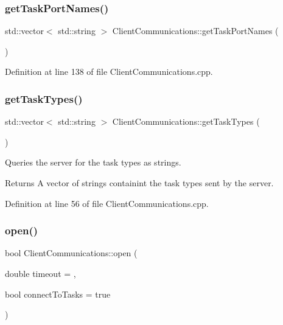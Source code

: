 \subsubsection{\texorpdfstring{get\+Task\+Port\+Names()}{getTaskPortNames()}}
{\footnotesize\ttfamily std\+::vector$<$ std\+::string $>$ Client\+Communications\+::get\+Task\+Port\+Names (\begin{DoxyParamCaption}{ }\end{DoxyParamCaption})}



Definition at line 138 of file Client\+Communications.\+cpp.

\hypertarget{classocra__recipes_1_1ClientCommunications_a0a7b2eeaa35d925e63ba4568be1e4919}{}\label{classocra__recipes_1_1ClientCommunications_a0a7b2eeaa35d925e63ba4568be1e4919} 
\subsubsection{\texorpdfstring{get\+Task\+Types()}{getTaskTypes()}}
{\footnotesize\ttfamily std\+::vector$<$ std\+::string $>$ Client\+Communications\+::get\+Task\+Types (\begin{DoxyParamCaption}{ }\end{DoxyParamCaption})}

Queries the server for the task types as strings.

\begin{DoxyReturn}{Returns}
A vector of strings containint the task types sent by the server. 
\end{DoxyReturn}


Definition at line 56 of file Client\+Communications.\+cpp.

\hypertarget{classocra__recipes_1_1ClientCommunications_a5ef6606831f855ae97815f4a34e1e1a1}{}\label{classocra__recipes_1_1ClientCommunications_a5ef6606831f855ae97815f4a34e1e1a1} 
\subsubsection{\texorpdfstring{open()}{open()}}
{\footnotesize\ttfamily bool Client\+Communications\+::open (\begin{DoxyParamCaption}\item[{double}]{timeout = {},  }\item[{bool}]{connect\+To\+Tasks = {\ttfamily true} }\end{DoxyParamCaption})}

